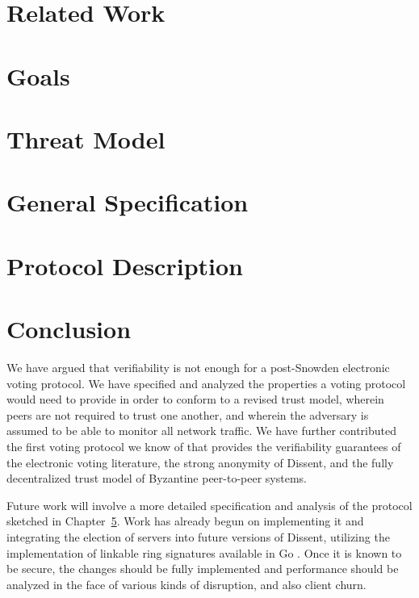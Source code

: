 \documentclass[finalcopy,nolof,nolot]{srpaper}
\begin{document}
\chapter{Related Work}\label{Chapter:Existing}


\chapter{Goals}\label{Chapter:Goals}


\chapter{Threat Model}\label{Chapter:Threats}


\chapter{General Specification}\label{Chapter:Spec}


\chapter{Protocol Description}\label{Chapter:Protocol}


\chapter{Conclusion}\label{Chapter:Conclusion}
We have argued that verifiability is not enough for a
post-Snowden electronic voting protocol. We have specified and analyzed the
properties a voting protocol would need to provide in order to conform to a
revised trust model, wherein peers are not required to trust one another, and
wherein the adversary is assumed to be able to monitor all network traffic. We
have further contributed the first voting protocol we know of that provides the
verifiability guarantees of the electronic voting literature, the strong
anonymity of Dissent, and the fully decentralized trust model of Byzantine
peer-to-peer systems.

Future work will involve a more detailed specification and analysis of the
protocol sketched in Chapter~\ref{Chapter:Protocol}. Work has already begun on
implementing it and integrating the election of servers into future versions of
Dissent, utilizing the implementation of linkable ring signatures available in
Go \cite{golrs}. Once it is known to be secure, the changes should be fully
implemented and performance should be analyzed in the face of various kinds of
disruption, and also client churn.
\end{document}
